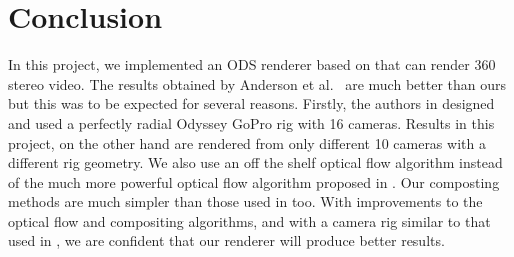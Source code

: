 \documentclass[10pt,twocolumn,letterpaper]{article}
\begin{document}
\section{Conclusion}
\label{conclusion}
In this project, we implemented an ODS renderer based on \cite{jump16} that can render 360 stereo video.  The results obtained by Anderson et al.~\cite{jump16} are much better than ours but this was to be expected for several reasons. Firstly, the authors in \cite{jump16} designed and used a perfectly radial Odyssey GoPro rig with 16 cameras. Results in this project, on the other hand are rendered from only different 10 cameras with a different rig geometry. We also use an off the shelf optical flow algorithm instead of the much more powerful optical flow algorithm proposed in \cite{jump16}. Our composting methods are much simpler than those used in \cite{jump16} too. With improvements to the optical flow and compositing algorithms, and with a camera rig similar to that used in \cite{jump16}, we are confident that our renderer will produce better results.

{\small


}
\end{document}
